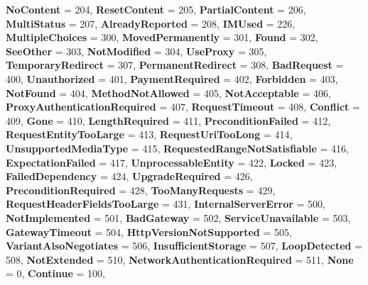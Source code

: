 \begin{DoxyCompactItemize}
{\bfseries No\+Content} = 204, 
{\bfseries Reset\+Content} = 205, 
\newline
{\bfseries Partial\+Content} = 206, 
{\bfseries Multi\+Status} = 207, 
{\bfseries Already\+Reported} = 208, 
{\bfseries I\+M\+Used} = 226, 
\newline
{\bfseries Multiple\+Choices} = 300, 
{\bfseries Moved\+Permanently} = 301, 
{\bfseries Found} = 302, 
{\bfseries See\+Other} = 303, 
\newline
{\bfseries Not\+Modified} = 304, 
{\bfseries Use\+Proxy} = 305, 
{\bfseries Temporary\+Redirect} = 307, 
{\bfseries Permanent\+Redirect} = 308, 
\newline
{\bfseries Bad\+Request} = 400, 
{\bfseries Unauthorized} = 401, 
{\bfseries Payment\+Required} = 402, 
{\bfseries Forbidden} = 403, 
\newline
{\bfseries Not\+Found} = 404, 
{\bfseries Method\+Not\+Allowed} = 405, 
{\bfseries Not\+Acceptable} = 406, 
{\bfseries Proxy\+Authentication\+Required} = 407, 
\newline
{\bfseries Request\+Timeout} = 408, 
{\bfseries Conflict} = 409, 
{\bfseries Gone} = 410, 
{\bfseries Length\+Required} = 411, 
\newline
{\bfseries Precondition\+Failed} = 412, 
{\bfseries Request\+Entity\+Too\+Large} = 413, 
{\bfseries Request\+Uri\+Too\+Long} = 414, 
{\bfseries Unsupported\+Media\+Type} = 415, 
\newline
{\bfseries Requested\+Range\+Not\+Satisfiable} = 416, 
{\bfseries Expectation\+Failed} = 417, 
{\bfseries Unprocessable\+Entity} = 422, 
{\bfseries Locked} = 423, 
\newline
{\bfseries Failed\+Dependency} = 424, 
{\bfseries Upgrade\+Required} = 426, 
{\bfseries Precondition\+Required} = 428, 
{\bfseries Too\+Many\+Requests} = 429, 
\newline
{\bfseries Request\+Header\+Fields\+Too\+Large} = 431, 
{\bfseries Internal\+Server\+Error} = 500, 
{\bfseries Not\+Implemented} = 501, 
{\bfseries Bad\+Gateway} = 502, 
\newline
{\bfseries Service\+Unavailable} = 503, 
{\bfseries Gateway\+Timeout} = 504, 
{\bfseries Http\+Version\+Not\+Supported} = 505, 
{\bfseries Variant\+Also\+Negotiates} = 506, 
\newline
{\bfseries Insufficient\+Storage} = 507, 
{\bfseries Loop\+Detected} = 508, 
{\bfseries Not\+Extended} = 510, 
{\bfseries Network\+Authentication\+Required} = 511, 
\newline
{\bfseries None} = 0, 
{\bfseries Continue} = 100, 

\end{DoxyCompactItemize}
